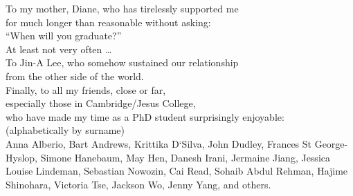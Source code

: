 \documentclass[thesis]{subfiles}
\begin{document}

\begin{dedication}
To my mother, Diane, who has tirelessly supported me\\
for much longer than reasonable without asking:\\
``When will you graduate?''\\
At least not very often \ldots\\
\vspace{0.33\textheight minus 10ex}
To Jin-A Lee, who somehow sustained our relationship\\
from the other side of the world.\\
\vspace{0.11\textheight minus 10ex}
Finally, to all my friends, close or far,\\
especially those in Cambridge/Jesus College,\\
who have made my time as a PhD student surprisingly enjoyable:\\
\vspace{1em}
{\small(alphabetically by surname)}\\
\vspace{0.5em}
Anna Alberio,
Bart Andrews,
Krittika D`Silva,
John Dudley,
Frances St George-Hyslop,
Simone Hanebaum,
May Hen,
Danesh Irani,
Jermaine Jiang,
Jessica Louise Lindeman,
Sebastian Nowozin,
Cai Read,
Sohaib Abdul Rehman,
Hajime Shinohara,
Victoria Tse,
Jackson Wo,
Jenny Yang,
and others.
\end{dedication}
\end{document}
